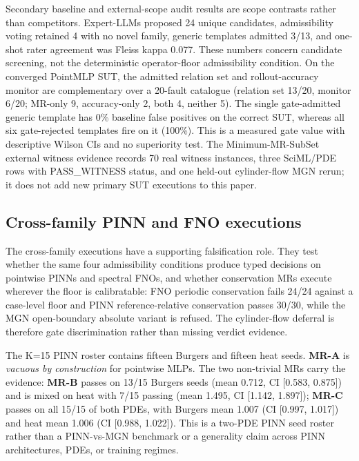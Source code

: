 Secondary baseline and external-scope audit results are scope contrasts rather than competitors. Expert-LLMs proposed 24 unique candidates, admissibility voting retained 4 with no novel family, generic templates admitted 3/13, and one-shot rater agreement was Fleiss kappa 0.077. These numbers concern candidate screening, not the deterministic operator-floor admissibility condition. On the converged PointMLP SUT, the admitted relation set and rollout-accuracy monitor are complementary over a 20-fault catalogue (relation set 13/20, monitor 6/20; MR-only 9, accuracy-only 2, both 4, neither 5). The single gate-admitted generic template has 0\% baseline false positives on the correct SUT, whereas all six gate-rejected templates fire on it (100\%). This is a measured gate value with descriptive Wilson CIs and no superiority test. The Minimum-MR-SubSet external witness evidence records 70 real witness instances, three SciML/PDE rows with PASS\_WITNESS status, and one held-out cylinder-flow MGN rerun; it does not add new primary SUT executions to this paper.

\subsection{Cross-family PINN and FNO executions}
\label{subsec:pinn-extension}

The cross-family executions have a supporting falsification role. They test whether the same four admissibility conditions produce typed decisions on pointwise PINNs and spectral FNOs, and whether conservation MRs execute wherever the floor is calibratable: FNO periodic conservation fails 24/24 against a case-level floor and PINN reference-relative conservation passes 30/30, while the MGN open-boundary absolute variant is refused. The cylinder-flow deferral is therefore gate discrimination rather than missing verdict evidence.

The K=15 PINN roster contains fifteen Burgers and fifteen heat seeds. \textbf{MR-A} is \emph{vacuous by construction} for pointwise MLPs. The two non-trivial MRs carry the evidence: \textbf{MR-B} passes on 13/15 Burgers seeds (mean 0.712, CI [0.583, 0.875]) and is mixed on heat with 7/15 passing (mean 1.495, CI [1.142, 1.897]); \textbf{MR-C} passes on all 15/15 of both PDEs, with Burgers mean 1.007 (CI [0.997, 1.017]) and heat mean 1.006 (CI [0.988, 1.022]). This is a two-PDE PINN seed roster rather than a PINN-vs-MGN benchmark or a generality claim across PINN architectures, PDEs, or training regimes.


